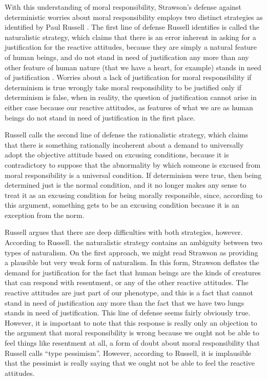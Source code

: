 \documentclass[phd,12pt,oneside,paper=letterpaper]{ubcthesis}
\begin{document}
With this understanding of moral responsibility, Strawson's defense against deterministic worries about moral responsibility employs two distinct strategies as identified by Paul Russell \citeyearpar{russell1992}. The first line of defense Russell identifies is called the naturalistic strategy, which claims that there is an error inherent in asking for a justification for the reactive attitudes, because they are simply a natural feature of human beings, and do not stand in need of justification any more than any other feature of human nature (that we have a heart, for example) stands in need of justification \citep[p.293]{russell1992}. Worries about a lack of justification for moral responsibility if determinism is true wrongly take moral responsibility to be justified only if determinism is false, when in reality, the question of justification cannot arise in either case because our reactive attitudes, as features of what we are as human beings do not stand in need of justification in the first place.

Russell calls the second line of defense the rationalistic strategy, which claims that there is something rationally incoherent about a demand to universally adopt the objective attitude based on excusing conditions, because it is contradictory to suppose that the abnormality by which someone is excused from moral responsibility is a universal condition. \citep[p.298]{russell1992}If determinism were true, then being determined just is the normal condition, and it no longer makes any sense to treat it as an excusing condition for being morally responsible, since, according to this argument, something gets to be an excusing condition because it is an exception from the norm. 

Russell argues that there are deep difficulties with both strategies, however. According to Russell. the naturalistic strategy contains an ambiguity between two types of naturalism. On the first approach, we might read Strawson as providing a plausible but very weak form of naturalism. In this form, Strawson deflates the demand for justification for the fact that human beings are the kinds of creatures that can respond with resentment, or any of the other reactive attitudes. The reactive attitudes are just part of our phenotype, and this is a fact that cannot stand in need of justification any more than the fact that we have two lungs stands in need of justification. This line of defense seems fairly obviously true.  However, it is important to note that this response is really only an objection to the argument that moral responsibility is wrong because we ought not be able to feel things like resentment at all, a form of doubt about moral responsibility that Russell calls ``type pessimism''. However, according to Russell, it is implausible that the pessimist is really saying that we ought not be able to feel the reactive attitudes. \citep[p.294]{russell1992} 
\end{document}
